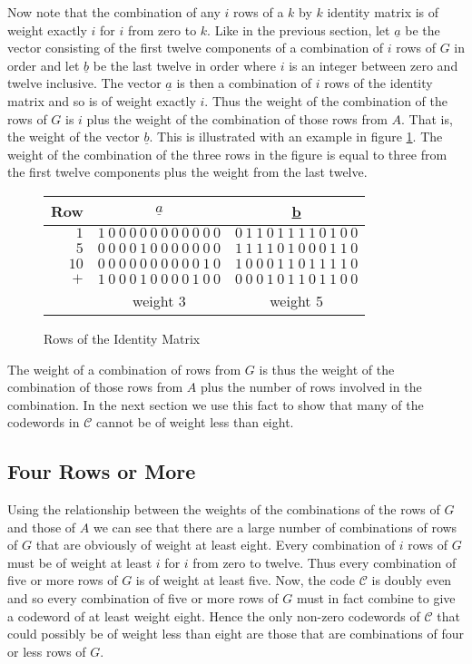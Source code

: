 Now note that the combination of any $i$ rows of a $k$ by $k$ identity matrix is of weight exactly $i$ for $i$ from zero to $k$.
Like in the previous section, let $\underline{a}$ be the vector consisting of the first twelve components of a combination of $i$ rows of $G$ in order and let $\underline{b}$ be the last twelve in order where $i$ is an integer between zero and twelve inclusive.
The vector $\underline{a}$ is then a combination of $i$ rows of the identity matrix and so is of weight exactly $i$.
Thus the weight of the combination of the rows of $G$ is $i$ plus the weight of the combination of those rows from $A$.
That is, the weight of the vector $\underline{b}$.
This is illustrated with an example in figure \ref{fig:rowsimat}.
The weight of the combination of the three rows in the figure is equal to three from the first twelve components plus the weight from the last twelve.
\begin{figure}
\begin{center}
\begin{tabular}{|r|c|c|}
	\hline
	Row & $\underline{a}$ & \underline{b} \\
	\hline
	$1$ & $1\ 0\ 0\ 0\ 0\ 0\ 0\ 0\ 0\ 0\ 0\ 0$ & $0\ 1\ 1\ 0\ 1\ 1\ 1\ 1\ 0\ 1\ 0\ 0$ \\
	$5$ & $0\ 0\ 0\ 0\ 1\ 0\ 0\ 0\ 0\ 0\ 0\ 0$ & $1\ 1\ 1\ 1\ 0\ 1\ 0\ 0\ 0\ 1\ 1\ 0$ \\
	$10$ & $0\ 0\ 0\ 0\ 0\ 0\ 0\ 0\ 0\ 0\ 1\ 0$ & $1\ 0\ 0\ 0\ 1\ 1\ 0\ 1\ 1\ 1\ 1\ 0$ \\								
	\hline
\rowcolor[rgb]{0.8,0.8,0.8} $+$ & $1\ 0\ 0\ 0\ 1\ 0\ 0\ 0\ 0\ 1\ 0\ 0$ & $0\ 0\ 0\ 1\ 0\ 1\ 1\ 0\ 1\ 1\ 0\ 0$ \\
	\hline
	& weight 3 & weight 5 \\
	\hline
\end{tabular}
\caption{Rows of the Identity Matrix}
\label{fig:rowsimat}
\end{center}
\end{figure}

The weight of a combination of rows from $G$ is thus the weight of the combination of those rows from $A$ plus the number of rows involved in the combination.
In the next section we use this fact to show that many of the codewords in $\mathcal{C}$ cannot be of weight less than eight.

\subsection{Four Rows or More}
Using the relationship between the weights of the combinations of the rows of $G$ and those of $A$ we can see that there are a large number of combinations of rows of $G$ that are obviously of weight at least eight.
Every combination of $i$ rows of $G$ must be of weight at least $i$ for $i$ from zero to twelve.
Thus every combination of five or more rows of $G$ is of weight at least five.
Now, the code $\mathcal{C}$ is doubly even and so every combination of five or more rows of $G$ must in fact combine to give a codeword of at least weight eight.
Hence the only non-zero codewords of $\mathcal{C}$ that could possibly be of weight less than eight are those that are combinations of four or less rows of $G$.

